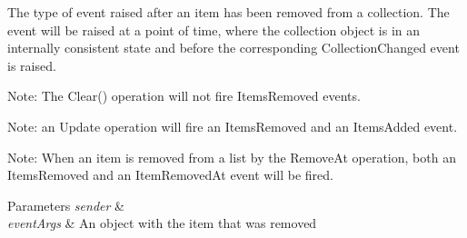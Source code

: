 The type of event raised after an item has been removed from a collection. The event will be raised at a point of time, where the collection object is in an internally consistent state and before the corresponding Collection\+Changed event is raised. 

Note\+: The Clear() operation will not fire Items\+Removed events. 

Note\+: an Update operation will fire an Items\+Removed and an Items\+Added event. 

Note\+: When an item is removed from a list by the Remove\+At operation, both an Items\+Removed and an Item\+Removed\+At event will be fired. 


\begin{DoxyParams}{Parameters}
{\em sender} & \\
\hline
{\em event\+Args} & An object with the item that was removed\\
\hline
\end{DoxyParams}

